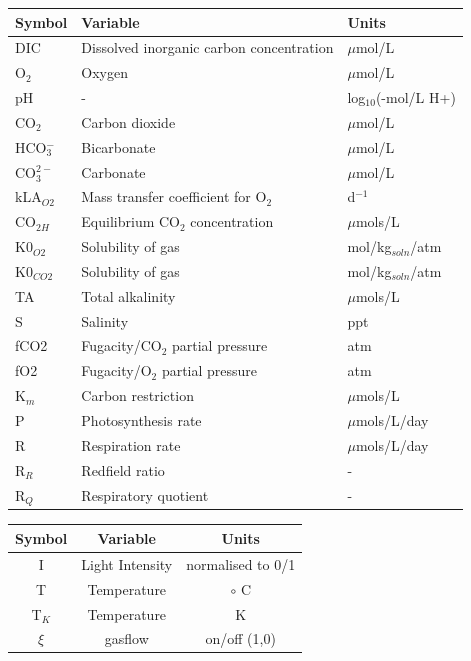 \documentclass{ruthesis}
\begin{document}


\clearpage
\begin{tabular}{l l  | l}
	 \hline 
	Symbol & Variable & Units  \\ \hline
	DIC &  Dissolved inorganic carbon concentration & $\mu$mol/L  \\
	O$_2$ & Oxygen  &  $\mu$mol/L \\
	pH & -  & log$_{10}$(-mol/L H+)  \\
	CO$_2$ & Carbon dioxide  & $\mu$mol/L \\
	HCO$_3^-$ & Bicarbonate & $\mu$mol/L  \\
	CO$_3^{2-}$ & Carbonate  & $\mu$mol/L \\
	kLA$_{O2}$  & Mass transfer coefficient for O$_2$ &  d$^{-1}$  \\
	
	CO$_{2H}$  & Equilibrium CO$_2$ concentration  & $\mu$mols/L  \\
	
	K0$_{O2}$ &  Solubility of gas & mol/kg$_{soln}$/atm  \\
	K0$_{CO2}$ & Solubility of gas & mol/kg$_{soln}$/atm   \\
	TA  & Total alkalinity & $\mu$mols/L  \\
	S  & Salinity &  ppt  \\
	fCO2  & Fugacity/CO$_2$ partial pressure &  atm  \\
	fO2  & Fugacity/O$_2$ partial pressure &  atm \\
	
	K$_m$ & Carbon restriction & $\mu$mols/L \\
	
	P & Photosynthesis rate & $\mu$mols/L/day \\
	R & Respiration rate & $\mu$mols/L/day \\
	R$_R$ & Redfield ratio & - \\	
	R$_Q$ & Respiratory quotient & - \\
\end{tabular}

\begin{tabular}{c c  | c}
	 \hline
	 Symbol & Variable & Units  \\ \hline
	I &  Light Intensity  &  normalised to 0/1   \\
	T & Temperature & $\circ$ C  \\
	T$_K$ & Temperature &  K  \\
	$\xi$ & gasflow &  on/off (1,0)  \\
	
\end{tabular}
\end{document}
